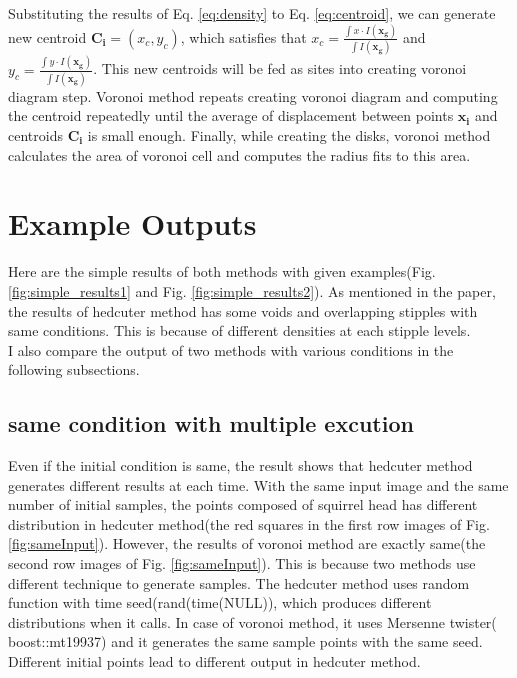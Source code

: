 \documentclass[11pt]{article}
\begin{document}
Substituting the results of Eq. \ref{eq:density} to Eq. \ref{eq:centroid}, we can generate new centroid $\mathbf{C_i}=(x_c, y_c)$,
which satisfies that $x_c=\frac{\int x\cdot I(\mathbf{x_g})}{\int I(\mathbf{x_g})}$ and $y_c=\frac{\int y\cdot I(\mathbf{x_g})}{\int I(\mathbf{x_g})}$.
This new centroids will be fed as sites into creating voronoi diagram step. Voronoi method repeats creating voronoi diagram and computing the centroid repeatedly until the average of displacement between points $\mathbf{x_i}$ and centroids $\mathbf{C_i}$ is small enough.
Finally, while creating the disks, voronoi method calculates the area of voronoi cell and computes the radius fits to this area.
\section{Example Outputs}\label{outputs}
Here are the simple results of both methods with given examples(Fig. \ref{fig:simple_results1} and Fig. \ref{fig:simple_results2}). As mentioned in the paper\cite{secord02}, the results of hedcuter method has some voids and overlapping stipples with same conditions. This is because of different densities at each stipple levels. \\
I also compare the output of two methods with various conditions in the following subsections.
\subsection{same condition with multiple excution}
Even if the initial condition is same, the result shows that hedcuter method generates different results at each time. With the same input image and the same number of initial samples, the points composed of squirrel head has different distribution in hedcuter method(the red squares in the first row images of Fig. \ref{fig:sameInput}). However, the results of voronoi method are exactly same(the second row images of Fig. \ref{fig:sameInput}). This is because two methods use different technique to generate samples. The hedcuter method uses random function with time seed(rand(time(NULL)), which produces different distributions when it calls. In case of voronoi method, it uses Mersenne twister(
boost::mt19937) and it generates the same sample points with the same seed. Different initial points lead to different output in hedcuter method.
\end{document}
